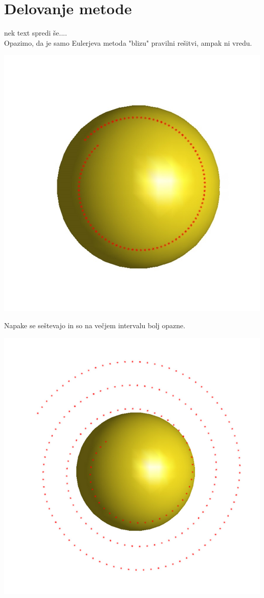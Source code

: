 \documentclass[]{article}
\begin{document}
\section{Delovanje metode}
	nek text spredi še....\\
	\newline
	Opazimo, da je samo Eulerjeva metoda "blizu" pravilni rešitvi, ampak ni vredu.
	\begin{center}
		\includegraphics[scale=0.30]{eul1}
	\end{center}
	Napake se seštevajo in so na večjem intervalu bolj opazne.\\
	\begin{center}
		\includegraphics[scale=0.30]{eul2}
	\end{center}
\end{document}
